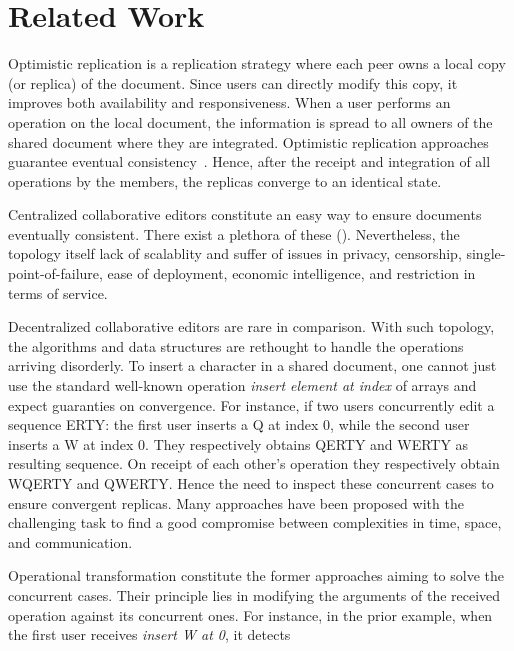 \section{Related Work}
\label{sec:relatedwork}

\begin{asparadesc}
\item[Optimistic replication] is a replication strategy where each peer owns a
  local copy (or replica) of the document. Since users can directly modify this
  copy, it improves both availability and responsiveness. When a user performs
  an operation on the local document, the information is spread to all owners of
  the shared document where they are integrated. Optimistic replication
  approaches guarantee eventual consistency~\cite{bailis2013eventual}. Hence,
  after the receipt and integration of all operations by the members, the
  replicas converge to an identical state.
\item[Centralized] collaborative editors constitute an easy way to ensure
  documents eventually consistent. There exist a plethora of these
  ().  Nevertheless, the topology itself lack of scalablity and
  suffer of issues in privacy, censorship, single-point-of-failure, ease of
  deployment, economic intelligence, and restriction in terms of service.
\item[Decentralized] collaborative editors are rare in comparison. With such
  topology, the algorithms and data structures are rethought to handle the
  operations arriving disorderly.  To insert a character in a shared document,
  one cannot just use the standard well-known operation \emph{insert element at
    index} of arrays and expect guaranties on convergence. For instance, if two
  users concurrently edit a sequence ERTY: the first user inserts a Q at index
  0, while the second user inserts a W at index 0. They respectively obtains
  QERTY and WERTY as resulting sequence. On receipt of each other's operation
  they respectively obtain WQERTY and QWERTY. Hence the need to inspect these
  concurrent cases to ensure convergent replicas.  Many approaches have been
  proposed with the challenging task to find a good compromise between
  complexities in time, space, and communication.
\item [Operational transformation] constitute the former approaches aiming to
  solve the concurrent cases. Their principle lies in modifying the arguments of
  the received operation against its concurrent ones. For instance, in the prior
  example, when the first user receives \emph{insert W at 0}, it detects

\end{asparadesc}
